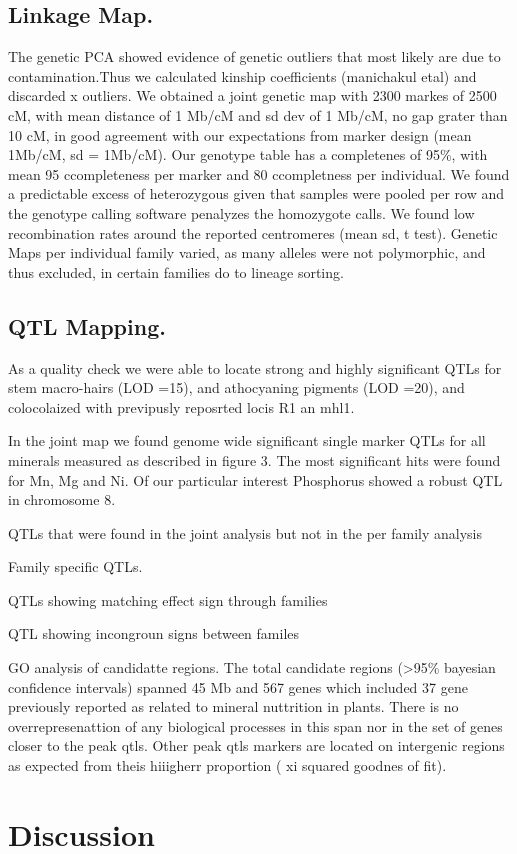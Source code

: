 \subsection{Linkage Map.}
The genetic PCA showed evidence of genetic outliers that most likely are due to contamination.Thus we calculated kinship coefficients (manichakul etal) and discarded x outliers.
We obtained a joint genetic map with 2300 markes of 2500 cM, with mean distance of 1 Mb/cM and sd dev of 1 Mb/cM, no gap grater than 10 cM, in good agreement with our expectations from marker design (mean 1Mb/cM, sd = 1Mb/cM).
Our genotype table has a completenes of 95\%, with mean 95 ccompleteness per marker and 80 ccompletness per individual.
We found a predictable excess of heterozygous given that samples were pooled per row and the genotype calling software penalyzes the homozygote calls.  We found low recombination rates around the reported centromeres (mean sd, t test).
Genetic Maps per individual family varied, as  many alleles were not  polymorphic, and thus excluded, in certain families do to lineage sorting. 

\subsection{QTL Mapping.}
As a quality check we were able to locate strong and highly significant QTLs for stem macro-hairs (LOD =15), and  athocyaning pigments (LOD =20), and colocolaized with previpusly reposrted locis R1 an mhl1.

In the joint map we found genome wide significant single marker QTLs for all minerals measured as described in figure 3. The most significant hits were found for Mn, Mg and Ni.  Of our particular interest Phosphorus showed a robust QTL in chromosome 8.

QTLs that were found in the joint analysis but not in the per family analysis

Family specific QTLs.

QTLs  showing matching  effect sign through families

QTL showing incongroun signs between familes


GO analysis of candidatte regions.
The total candidate regions (>95\% bayesian confidence intervals) spanned 45 Mb and 567 genes which included 37 gene previously reported as related to mineral nuttrition in plants. There is no overrepresenattion of any biological processes in this span nor in the set of genes closer to the peak qtls. Other peak qtls  markers are located on intergenic regions as expected from theis hiiigherr proportion ( xi squared goodnes of fit). 

\section{Discussion}

\printbibliography[heading=subbibintoc, title=References,]

